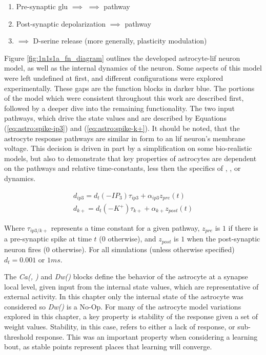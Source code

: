 \begin{enumerate}
  \item Pre-synaptic \gls{glu} $\implies$ \ipt $\implies$ \ca pathway
  \item Post-synaptic depolarization \kp $\implies$ \ca pathway
  \item \ca $\implies$ D-serine release (more generally, plasticity modulation)
\end{enumerate}


Figure \ref{fig:1n1s1a_fn_diagram} outlines the developed astrocyte-\gls{lif} neuron
model, as well as the internal dynamics of the neuron. Some aspects of this
model were left undefined at first, and different configurations were explored
experimentally. These gaps are the function blocks in darker blue. The
portions of the model which were consistent throughout this work are described
first, followed by a deeper dive into the remaining functionality. The two input
pathways, which drive the state values \ipt and \kp are described by Equations
(\ref{eq:astro:spike-ip3}) and (\ref{eq:astro:spike-k+}). It should be noted, that
the astrocyte response pathways are similar in form to an \gls{lif} neuron's membrane
voltage. This decision is driven in part by a simplification on some
bio-realistic models, but also to demonstrate that key properties of astrocytes
are dependent on the pathways and relative time-constants, less then the specifics of
\ca, \ipt, or \kp dynamics.

\begin{align}
  d_{ip3} = d_t (-IP_3)\tau_{ip3} + \alpha_{ip3} z_{pre}(t) \label{eq:astro:spike-ip3} \\
  d_{k+} = d_t (-K^+)\tau_{k+} + \alpha_{k+} z_{post}(t) \label{eq:astro:spike-k+}
\end{align}

Where $\tau_{ip3/k+}$ represents a time constant for a given pathway, $z_{pre}$
is $1$ if there is a pre-synaptic spike at time $t$ ($0$ otherwise), and
$z_{post}$ is $1$ when the post-synaptic neuron fires ($0$ otherwise). For all
simulations (unless otherwise specified) $d_t = 0.001$ or $1ms$.

The \emph{Ca(\ipt, \kp\!)} and \emph{Dw(\ca\!)} blocks define the behavior
of the astrocyte at a synapse local level, given input from the internal state values,
which are representative of external activity. In this chapter only the internal
state of the astrocyte was considered so \emph{Dw(\ca\!)} is a
No-Op. For many of the astrocyte model variations explored in this chapter, a
key property is stability of the response given a set of weight
values. Stability, in this case, refers to either a lack of \ca response, or
sub-threshold \ca response. This was an important property when considering
a learning bout, as stable points represent places that learning will converge.


